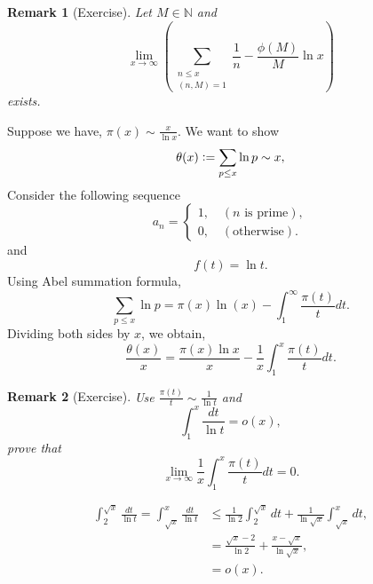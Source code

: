 \documentclass{article}
\newtheorem{remark}{Remark}[section]
\newcommand{\defeq}{\vcentcolon=}
\newcommand{\N}[0]{\mathbb{N}}
\begin{document}
\begin{remark}[Exercise]
  Let $M\in\N$ and 
  \begin{equation*}
    \lim_{x\to\infty}\left(\sum_{\substack{n\leq x\\ (n,M)=1}} {\frac 1 n} - {\frac {\phi(M)} M}\ln x\right)
  \end{equation*}
  exists.
\end{remark}

Suppose we have, $\pi(x)\sim {\frac x {\ln x}}$. We want to show
\begin{equation*}
  \theta(x)\defeq \sum_{p\leq x}\ln p\sim x,
\end{equation*}
Consider the following sequence
\begin{equation*}
  a_n = \begin{cases}
    1,\quad (\text{$n$ is prime}),\\
    0, \quad (\text{otherwise}).
  \end{cases}
\end{equation*}
and 
\begin{equation*}
  f(t) = \ln t.
\end{equation*}
Using Abel summation formula,
\begin{equation*}
  \sum_{p\leq x}\ln p = \pi(x)\ln(x) - \int_1^\infty {\frac {\pi(t)} t}dt.
\end{equation*}
Dividing both sides by $x$, we obtain,
\begin{equation*}
  {\frac {\theta(x)} x} = {\frac {\pi(x)\ln x} {x}}-{\frac 1 x}\int_1^x{\frac {\pi(t)} t}dt.
\end{equation*}
\begin{remark}[Exercise]
  Use ${\frac {\pi(t)} t}\sim{\frac 1 {\ln t}}$ and 
  \begin{equation*}
    \int_1^x{\frac {dt} {\ln t}} = o(x),
  \end{equation*}prove that 
  \begin{equation*}
    \lim_{x\to\infty}{\frac 1 x}\int_1^x{\frac {\pi(t)} t}dt = 0.
  \end{equation*}
\end{remark}
\begin{align*}
  \int_2^{\sqrt{x}}{\frac {dt} {\ln t}} = \int_{\sqrt{x}}^x {\frac {dt} {\ln t}} & \leq {\frac 1 {\ln 2}}\int_2^{\sqrt{x}}dt + {\frac 1 {\ln \sqrt{x}}}\int_{\sqrt{x}}^x dt,\\
  & = {\frac {\sqrt{x} -2} {\ln 2}} + {\frac {x-\sqrt{x}} {\ln \sqrt{x}}},\\
  & = o(x).
\end{align*}
\end{document}
